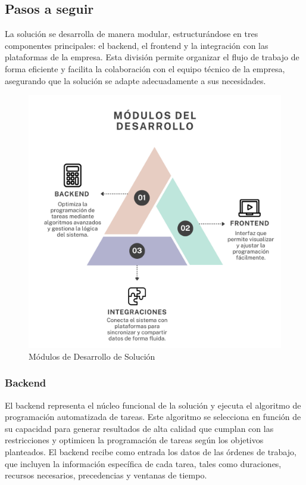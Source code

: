 \documentclass{article}
\begin{document}
\subsection{Pasos a seguir}

La solución se desarrolla de manera modular, estructurándose en tres componentes principales: el backend, el frontend y la integración con las plataformas de la empresa. Esta división permite organizar el flujo de trabajo de forma eficiente y facilita la colaboración con el equipo técnico de la empresa, asegurando que la solución se adapte adecuadamente a sus necesidades.

\begin{figure}[htbp]
  \centering
  \includegraphics[scale=0.3]{imgs/ModulosDesarrollo.png}
  \caption{Módulos de Desarrollo de Solución}
  \label{fig:modulos-desarrollo}
\end{figure}


\subsubsection{Backend}

El backend representa el núcleo funcional de la solución y ejecuta el algoritmo de programación automatizada de tareas. Este algoritmo se selecciona en función de su capacidad para generar resultados de alta calidad que cumplan con las restricciones y optimicen la programación de tareas según los objetivos planteados. El backend recibe como entrada los datos de las órdenes de trabajo, que incluyen la información específica de cada tarea, tales como duraciones, recursos necesarios, precedencias y ventanas de tiempo.
\end{document}
